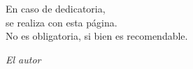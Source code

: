 
\cleardoublepage
\thispagestyle{empty} %

\begin{minipage}[c][\textheight][c]{\textwidth} %
\raggedleft %

En caso de dedicatoria, \\
se realiza con esta página.\\
No es obligatoria, si bien es recomendable.

\bigskip

\emph{El autor}

\end{minipage}

\blankpage
